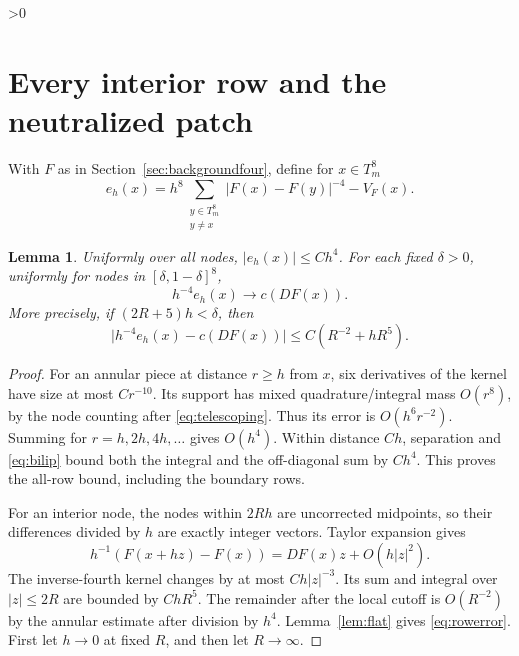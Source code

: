 \documentclass[11pt,a4paper]{article}
\newtheorem{lemma}[theorem]{Lemma}
\theoremstyle{definition}
\newcommand{\abs}[1]{\lvert#1\rvert}
\numberwithin{equation}{section}
\let\originalsection\section
\renewcommand{\section}{\ifnum\value{section}>0\clearpage\fi\originalsection}
\begin{document}
\section{Every interior row and the neutralized patch}\label{sec:rows}
With $F$ as in Section~\ref{sec:backgroundfour}, define for $x\in T_m^8$
\begin{equation}
 e_h(x)=h^8\sum_{\substack{y\in T_m^8\\y\ne x}}\abs{F(x)-F(y)}^{-4}-V_F(x).
\end{equation}

\begin{lemma}\label{lem:rows}
Uniformly over all nodes, $\abs{e_h(x)}\le Ch^4$. For each fixed $\delta>0$, uniformly for nodes in $[\delta,1-\delta]^8$,
\begin{equation}\label{eq:rowlimitfour}
 h^{-4}e_h(x)\longrightarrow c(DF(x)).
\end{equation}
More precisely, if $(2R+5)h<\delta$, then
\begin{equation}\label{eq:rowerror}
 \abs{h^{-4}e_h(x)-c(DF(x))}\le C(R^{-2}+hR^5).
\end{equation}
\end{lemma}
\begin{proof}
For an annular piece at distance $r\ge h$ from $x$, six derivatives of the kernel have size at most $Cr^{-10}$. Its support has mixed quadrature/integral mass $O(r^8)$, by the node counting after \eqref{eq:telescoping}. Thus its error is $O(h^6r^{-2})$. Summing for $r=h,2h,4h,\ldots$ gives $O(h^4)$. Within distance $Ch$, separation and \eqref{eq:bilip} bound both the integral and the off-diagonal sum by $Ch^4$. This proves the all-row bound, including the boundary rows.

For an interior node, the nodes within $2Rh$ are uncorrected midpoints, so their differences divided by $h$ are exactly integer vectors. Taylor expansion gives
\[
 h^{-1}(F(x+hz)-F(x))=DF(x)z+O(h\abs z^2).
\]
The inverse-fourth kernel changes by at most $Ch\abs z^{-3}$. Its sum and integral over $\abs z\le2R$ are bounded by $ChR^5$. The remainder after the local cutoff is $O(R^{-2})$ by the annular estimate after division by $h^4$. Lemma~\ref{lem:flat} gives \eqref{eq:rowerror}. First let $h\to0$ at fixed $R$, and then let $R\to\infty$.
\end{proof}
\end{document}
